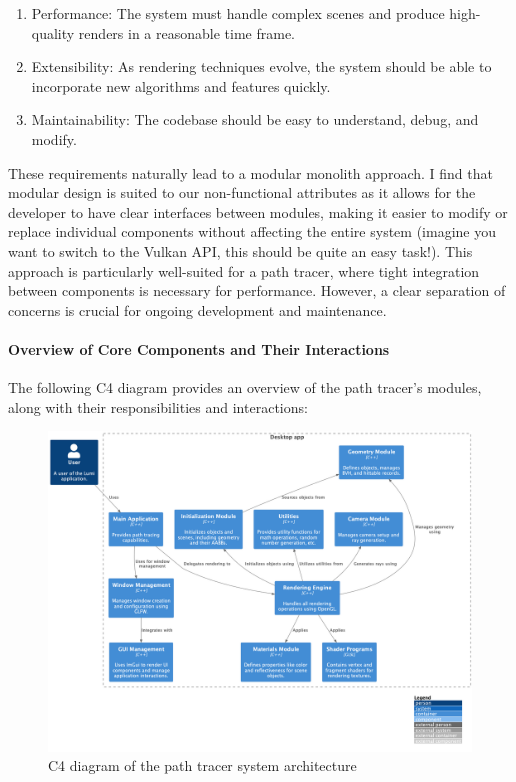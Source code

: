 \documentclass[12pt]{article}
\begin{document}
\begin{enumerate}
    \item Performance: The system must handle complex scenes and produce high-quality renders in a reasonable time frame.
    \item Extensibility: As rendering techniques evolve, the system should be able to incorporate new algorithms and features quickly.
    \item Maintainability: The codebase should be easy to understand, debug, and modify.
\end{enumerate}

These requirements naturally lead to a modular monolith approach. I find that modular design is suited to our non-functional attributes as it allows for the developer to have clear interfaces between modules, making it easier to modify or replace individual components without affecting the entire system (imagine you want to switch to the Vulkan API, this should be quite an easy task!). This approach is particularly well-suited for a path tracer, where tight integration between components is necessary for performance. However, a clear separation of concerns is crucial for ongoing development and maintenance.

\paragraph{Overview of Core Components and Their Interactions}

The following C4 diagram provides an overview of the path tracer's modules, along with their responsibilities and interactions:

\begin{figure}[H]
    \centering
    \includegraphics[width=\textwidth]{images/software_architecture/lumi_pml.png}
    \caption{C4 diagram of the path tracer system architecture}
    \label{fig:c4-diagram}
\end{figure}
\end{document}
